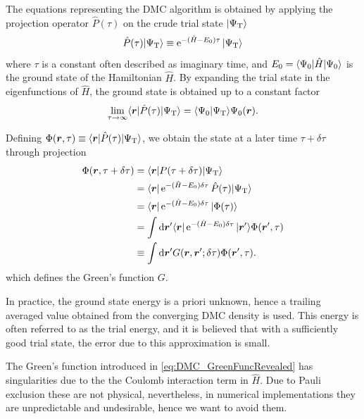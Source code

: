 The equations representing the DMC algorithm is obtained by applying the projection operator $\hat{P}(\tau)$ on the crude trial state $| \Psi_{\mathrm{T}} \rangle$
\begin{equation}
 \hat{P}(\tau)| \Psi_{\mathrm{T}} \rangle \equiv \operatorname{e}^{-(\hat{H} - E_0)\tau} | \Psi_{\mathrm{T}} \rangle
\end{equation}
where $\tau$ is a constant often described as imaginary time, and $E_0=\langle \Psi_0 |\hat{H}| \Psi_0 \rangle$ is the ground state of the Hamiltonian $\hat{H}$. By expanding the trial state in the eigenfunctions of $\hat{H}$, the ground state is obtained up to a constant factor
\begin{equation}
 \label{eq:DMC_ExactProjection}
 \lim_{\tau\to\infty} \langle \bm{r} |  \hat{P}(\tau) | \Psi_{\mathrm{T}} \rangle = \langle \Psi_0 | \Psi_{\mathrm{T}}\rangle\Psi_0(\bm{r}).
\end{equation}

Defining $\Phi(\bm{r}, \tau) \equiv \langle \bm{r} |\hat{P}(\tau)| \Psi_{\mathrm{T}} \rangle$, we obtain the state at a later time $\tau + \delta\tau$ through projection
\begin{align}
 \Phi(\bm{r}, \tau + \delta\tau) &= \langle \bm{r} | P(\tau + \delta\tau) | \Psi_{\mathrm{T}} \rangle \notag\\
 &= \langle \bm{r} | \operatorname{e}^{-(\hat{H} - E_0)\delta\tau} \hat{P}(\tau) | \Psi_{\mathrm{T}} \rangle \notag\\
 &= \langle \bm{r} | \operatorname{e}^{-(\hat{H} - E_0)\delta\tau} | \Phi(\tau) \rangle \notag\\
 &= \int \operatorname{d\!}\bm{r}' \langle \bm{r} | \operatorname{e}^{-(\hat{H} - E_0)\delta\tau} | \bm{r}' \rangle \Phi(\bm{r}', \tau)\notag \\
 &\equiv \int \operatorname{d\!}\bm{r}' G(\bm{r}, \bm{r}'; \delta\tau) \Phi(\bm{r}', \tau). \label{eq:DMC_GreenFuncRevealed}
\end{align}
which defines the Green's function $G$.

In practice, the ground state energy is a priori unknown, hence a trailing averaged value obtained from the converging DMC density is used. This energy is often referred to as the trial energy, and it is believed that with a sufficiently good trial state, the error due to this approximation is small.

The Green's function introduced in \eqref{eq:DMC_GreenFuncRevealed} has singularities due to the the Coulomb interaction term in $\hat{H}$. Due to Pauli exclusion these are not physical, nevertheless, in numerical implementations they are unpredictable and undesirable, hence we want to avoid them.

